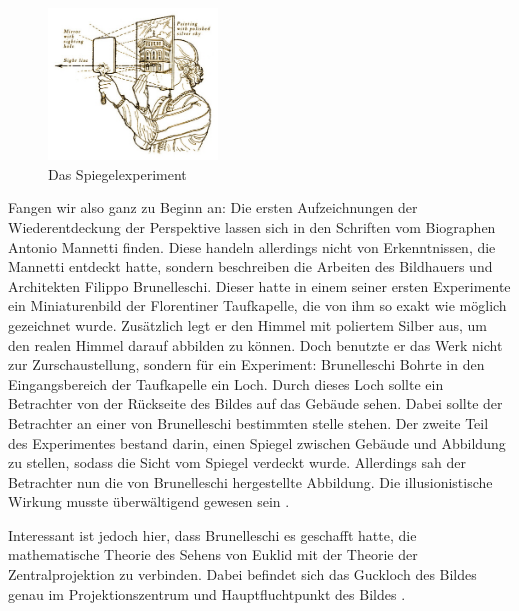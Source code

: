 \documentclass[12pt,a4paper]{article}
\begin{document}
\begin{figure}
\centering
\includegraphics[width=0.4\textwidth]{Bilder/Brunelleschi-Zentralperspektive.jpg}
\caption{Das  Spiegelexperiment\protect\footnotemark[3]}%
\label{fig:brunnelli1}
\end{figure}


Fangen wir also ganz zu Beginn an: Die ersten Aufzeichnungen der Wiederentdeckung der Perspektive lassen sich in den Schriften vom Biographen Antonio Mannetti finden. Diese handeln allerdings nicht von Erkenntnissen, die Mannetti entdeckt hatte, sondern beschreiben die Arbeiten des Bildhauers und Architekten Filippo Brunelleschi. Dieser hatte in einem seiner ersten Experimente ein Miniaturenbild der Florentiner Taufkapelle, die von ihm so exakt wie möglich gezeichnet wurde. Zusätzlich legt er den Himmel mit poliertem Silber aus, um den realen Himmel darauf abbilden zu können. Doch benutzte er das Werk nicht zur Zurschaustellung, sondern für ein Experiment: Brunelleschi Bohrte in den Eingangsbereich der Taufkapelle ein Loch. Durch dieses Loch sollte ein Betrachter von der Rückseite des Bildes auf das Gebäude sehen. Dabei sollte der Betrachter an einer von Brunelleschi bestimmten stelle stehen. Der zweite Teil des Experimentes bestand darin, einen Spiegel zwischen Gebäude und Abbildung zu stellen, sodass die Sicht vom Spiegel verdeckt wurde. Allerdings sah der Betrachter nun die von Brunelleschi hergestellte Abbildung. Die illusionistische Wirkung musste überwältigend gewesen sein \citep[S.~28f]{perspektive}.

Interessant ist jedoch hier, dass Brunelleschi es geschafft hatte, die mathematische Theorie des Sehens von Euklid mit der Theorie der Zentralprojektion zu verbinden. Dabei befindet sich das Guckloch des Bildes genau im Projektionszentrum und Hauptfluchtpunkt des Bildes \citep[S.~30]{perspektive}.
\end{document}
